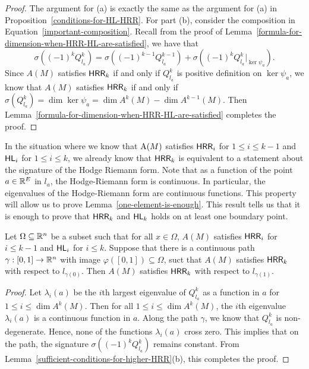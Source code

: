 \documentclass{puthesis-UG}
\begin{document}
\begin{proof}
	The argument for (a) is exactly the same as the argument for (a) in Proposition~\ref{conditions-for-HL-HRR}. For part (b), consider the composition in Equation~\ref{important-composition}. Recall from the proof of Lemma~\ref{formula-for-dimension-when-HRR-HL-are-satisfied}, we have that 
	\[
		\sigma ((-1)^k Q_{l_a}^k) = \sigma \left((-1)^{k-1} Q_{l_a}^{k-1}\right) + \sigma \left((-1)^k Q_{l_a}^k |_{\ker \psi_a}\right).
	\]
	Since $A(M)$ satisfies $\mathsf{HRR}_k$ if and only if $Q_{l_a}^k$ is positive definition on $\ker \psi_a$, we know that $A(M)$ satisfies $\mathsf{HRR}_k$ if and only if $\sigma (Q_{l_a}^k) = \dim \ker \psi_a = \dim A^k(M) - \dim A^{k-1}(M)$. Then Lemma~\ref{formula-for-dimension-when-HRR-HL-are-satisfied} completes the proof.  
\end{proof}

In the situation where we know that $\operatorname{A}(M)$ satisfies $\mathsf{HRR}_i$ for $1 \leq i \leq k-1$ and $\mathsf{HL}_i$ for $1 \leq i \leq k$, we already know that $\mathsf{HRR}_k$ is equivalent to a statement about the signature of the Hodge Riemann form. Note that as a function of the point $a \in \mathbb{R}^E$ in $l_a$, the Hodge-Riemann form is continuous. In particular, the eigenvalues of the Hodge-Riemann form are continuous functions. This property will allow us to prove Lemma~\ref{one-element-is-enough}. This result tells us that it is enough to prove that $\mathsf{HRR}_k$ and $\mathsf{HL}_k$ holds on at least one boundary point. 

\begin{lem} \label{one-element-is-enough}
	Let $\Omega \subseteq \mathbb{R}^n$ be a subset such that for all $x \in \Omega$, $A(M)$ satisfies $\mathsf{HRR}_i$ for $i \leq k-1$ and $\mathsf{HL}_i$ for $i \leq k$. Suppose that there is a continuous path $\gamma : [0, 1] \to \mathbb{R}^n$ with image $\varphi ([0, 1]) \subseteq \Omega$, suct that $A(M)$ satisfies $\mathsf{HRR}_k$ with respect to $l_{\gamma(0)}$. Then $A(M)$ satisfies $\mathsf{HRR}_k$ with respect to $l_{\gamma(1)}$. 
\end{lem}

\begin{proof}
	Let $\lambda_i(a)$ be the $i$th largest eigenvalue of $Q_{l_a}^k$ as a function in $a$ for $1 \leq i \leq \dim A^k(M)$. Then for all $1 \leq i \leq \dim A^k(M)$, the $i$th eigenvalue $\lambda_i(a)$ is a continuous function in $a$. Along the path $\gamma$, we know that $Q_{l_a}^k$ is non-degenerate. Hence, none of the functions $\lambda_i(a)$ cross zero. This implies that on the path, the signature $\sigma \left((-1)^k Q_{l_a}^k\right)$ remains constant. From Lemma~\ref{sufficient-conditions-for-higher-HRR}(b), this completes the proof.
\end{proof}
\end{document}
